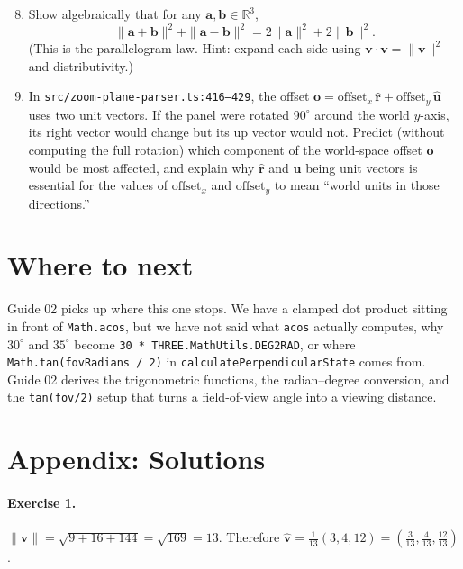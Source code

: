 \documentclass{article}
\begin{document}
\begin{enumerate}
  \setcounter{enumi}{7}
  \item Show algebraically that for any $\mathbf{a}, \mathbf{b} \in \mathbb{R}^3$,
        \[
        \|\mathbf{a}+\mathbf{b}\|^2 + \|\mathbf{a}-\mathbf{b}\|^2 = 2\|\mathbf{a}\|^2 + 2\|\mathbf{b}\|^2.
        \]
        (This is the parallelogram law. Hint: expand each side using $\mathbf{v}\cdot\mathbf{v} = \|\mathbf{v}\|^2$ and distributivity.)

  \item In \texttt{src/zoom-plane-parser.ts:416--429}, the offset
        $\mathbf{o} = \text{offset}_x\,\hat{\mathbf{r}} + \text{offset}_y\,\hat{\mathbf{u}}$ uses two unit vectors. If the panel were rotated $90^\circ$ around the world $y$-axis, its right vector would change but its up vector would not. Predict (without computing the full rotation) which component of the world-space offset $\mathbf{o}$ would be most affected, and explain why $\hat{\mathbf{r}}$ and $\hat{\mathbf{u}}$ being unit vectors is essential for the values of $\text{offset}_x$ and $\text{offset}_y$ to mean ``world units in those directions.''
\end{enumerate}

\section{Where to next}

Guide 02 picks up where this one stops. We have a clamped dot product
sitting in front of \texttt{Math.acos}, but we have not said what
\texttt{acos} actually computes, why $30^\circ$ and $35^\circ$ become
\texttt{30 * THREE.MathUtils.DEG2RAD}, or where \texttt{Math.tan(fovRadians / 2)}
in \texttt{calculatePerpendicularState} comes from. Guide 02 derives the
trigonometric functions, the radian--degree conversion, and the
\texttt{tan(fov/2)} setup that turns a field-of-view angle into a viewing
distance.

\appendix
\section*{Appendix: Solutions}

\paragraph{Exercise 1.}
$\|\mathbf{v}\| = \sqrt{9 + 16 + 144} = \sqrt{169} = 13$.
Therefore $\hat{\mathbf{v}} = \tfrac{1}{13}(3, 4, 12) = \left(\tfrac{3}{13}, \tfrac{4}{13}, \tfrac{12}{13}\right)$.
\end{document}
